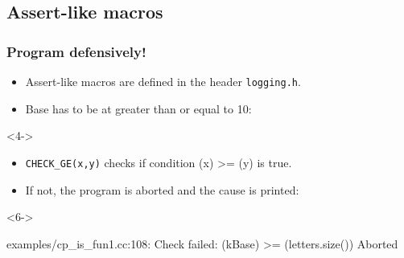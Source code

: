 \documentclass[utf8x,xcolor=dvipsnames]{beamer}
\newcommand{\code}[1]{\texttt{#1}}
\begin{document}
\subsection{Assert-like macros}
\begin{frame}[fragile]
\frametitle{Program defensively!}
\begin{itemize}
 \item<2-> Assert-like macros are defined in the header \code{logging.h}.
 \item<3-> Base has to be at greater than or equal to 10:
\end{itemize}

\begin{uncoverenv}<4->
\begin{mycode}
 
\end{mycode}
\end{uncoverenv}

\begin{itemize}
 \item<5-> \code{CHECK\_GE(x,y)} checks if condition (x) \textgreater{}= (y) is true.
 \item<6-> If not, the program is aborted and the cause is printed:
\end{itemize}

\begin{uncoverenv}<6->
\begin{mycode}
[23:51:34] examples/cp\_is\_fun1.cc:108: Check failed:
                                             (kBase) \textgreater{}= (letters.size())
Aborted
\end{mycode}
\end{uncoverenv}

\end{frame}
\end{document}
